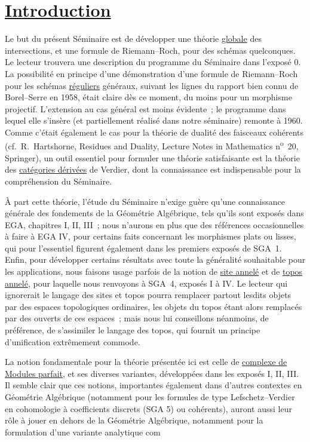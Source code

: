 \section*{\underline{Introduction}}
Le but du présent Séminaire est de développer une théorie \underline{globale} des intersections, et une formule de Riemann--Roch, pour des schémas quelconques. Le lecteur trouvera une description du programme du Séminaire dans l'exposé 0. La possibilité en principe d'une démonstration d'une formule de Riemann--Roch pour les schémas \underline{réguliers} généraux, suivant les lignes du rapport bien connu de Borel--Serre en 1958, était claire dès ce moment, du moins pour un morphisme projectif. L'extension au cas général est moins évidente~; le programme dans lequel elle s'insère (et partiellement réalisé dans notre séminaire) remonte à 1960. Comme c'était également le cas pour la théorie de dualité des faisceaux cohérents (cf.\ R.~Hartshorne, Residues and Duality, Lecture Notes in Mathematics n\textsuperscript{o}~20, Springer), un outil essentiel pour formuler une théorie satisfaisante est la théorie des \underline{catégories dérivées} de Verdier, dont la connaissance est indispensable pour la compréhension du Séminaire.

À part cette théorie, l'étude du Séminaire n'exige guère qu'une connaissance générale des fondements de la Géométrie Algébrique, tels qu'ils sont exposés dans EGA, chapitres I, II, III~; nous n'aurons en plus que des références occasionnelles à faire à EGA IV, pour certains faits concernant les morphismes plats ou lisses, qui pour l'essentiel figurent également dans les premiers exposés de SGA~1. Enfin, pour développer certains résultats avec toute la généralité souhaitable pour les applications, nous faisons usage parfois de la notion de \underline{site annelé} et de \underline{topos annelé}, pour laquelle nous renvoyons à SGA~4, exposés I à IV. Le lecteur qui ignorerait le langage des sites et topos pourra remplacer partout lesdits objets par des espaces topologiques ordinaires, les objets du topos étant alors remplacés par des ouverts de ces espaces~; mais nous lui conseillons néanmoins, de préférence, de s'assimiler le langage des topos, qui fournit un principe d'unification extrêmement commode.

La notion fondamentale pour la théorie présentée ici est celle de \underline{complexe de Modules parfait}, et ses diverses variantes, développées dans les exposés I, II, III. Il semble clair que ces notions, importantes également dans d'autres contextes en Géométrie Algébrique (notamment pour les formules de type Lefschetz--Verdier en cohomologie à coefficients discrets (SGA 5) ou cohérents), auront aussi leur rôle à jouer en dehors de la Géométrie Algébrique, notamment pour la formulation d'une variante analytique com%
